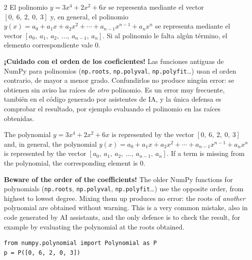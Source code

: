\begin{paracol}{2}
El polinomio $y=3x^4+2x^2+6x$ se representa mediante el vector $[0,\ 6,\ 2,\ 0,\ 3]$ y, en general, el polinomio $y(x)=a_0+a_1x+a_2x^2+\cdots+a_{n-1}x^{n-1}+ a_nx^n$ se representa mediante el vector $[a_0,\ a_1,\ a_2,\ \ldots,\ a_{n-1},\ a_n]$. Si al polinomio le falta algún término, el elemento correspondiente vale $0$.

\textbf{¡Cuidado con el orden de los coeficientes!} Las funciones antiguas de NumPy para polinomios (\texttt{np.roots}, \texttt{np.polyval}, \texttt{np.polyfit}\ldots) usan el orden contrario, de mayor a menor grado. Confundirlos no produce ningún error: se obtienen sin aviso las raíces de \emph{otro} polinomio. Es un error muy frecuente, también en el código generado por asistentes de IA, y la única defensa es comprobar el resultado, por ejemplo evaluando el polinomio en las raíces obtenidas.

\switchcolumn

The polynomial $y=3x^4+2x^2+6x$ is represented by the vector $[0,\ 6,\ 2,\ 0,\ 3]$ and, in general, the polynomial $y(x)=a_0+a_1x+a_2x^2+\cdots+a_{n-1}x^{n-1}+ a_nx^n$ is represented by the vector $[a_0,\ a_1,\ a_2,\ \ldots,\ a_{n-1},\ a_n]$. If a term is missing from the polynomial, the corresponding element is $0$.

\textbf{Beware of the order of the coefficients!} The older NumPy functions for polynomials (\texttt{np.roots}, \texttt{np.polyval}, \texttt{np.polyfit}\ldots) use the opposite order, from highest to lowest degree. Mixing them up produces no error: the roots of \emph{another} polynomial are obtained without warning. This is a very common mistake, also in code generated by AI assistants, and the only defence is to check the result, for example by evaluating the polynomial at the roots obtained.

\end{paracol}


\begin{verbatim}
from numpy.polynomial import Polynomial as P
p = P([0, 6, 2, 0, 3])
\end{verbatim}

